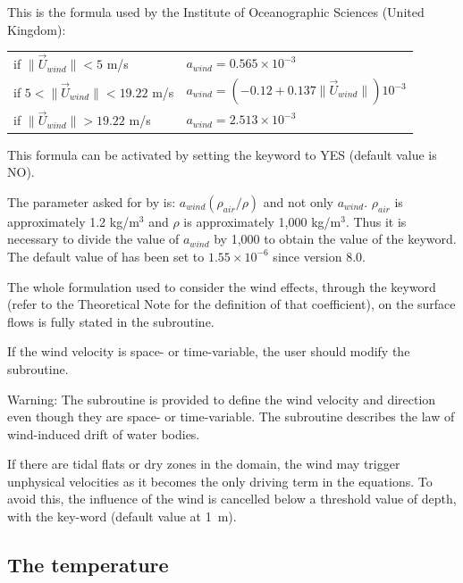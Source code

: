 This is the formula used by the Institute of Oceanographic Sciences (United
Kingdom):

\begin{tabular}{ll}
if $\| \vec{U}_{wind} \| < 5$ m/s & $a_{wind}  = 0.565 \times 10^{-3}$ \\
if $5 < \| \vec{U}_{wind} \| < 19.22$ m/s &
 $a_{wind} = (- 0.12 + 0.137 \| \vec{U}_{wind} \| ) 10^{-3}$ \\
if $\| \vec{U}_{wind} \| > 19.22$ m/s & $a_{wind} = 2.513 \times 10^{-3}$ \\
\end{tabular}

This formula can be activated by setting the keyword
 to YES
(default value is NO).

The parameter  asked for by 
is: $a_{wind} (\rho_{air} / \rho)$ and not only $a_{wind}$.
$\rho_{air}$ is approximately 1.2 kg/m$^3$ and $\rho$
is approximately 1,000 kg/m$^3$. Thus it is necessary to divide the value of
$a_{wind}$ by 1,000 to obtain the value of the  keyword.
The default value of  has been set to
$1.55 \times 10^{-6}$ since version 8.0.

The whole formulation used to consider the wind effects, through the keyword
 (refer to the Theoretical Note for the
definition of that coefficient), on the surface flows is fully stated in the
 subroutine.

If the wind velocity is space- or time-variable, the user should modify the
 subroutine.

\begin{WarningBlock}{Warning:}
The  subroutine is provided to define the wind velocity and
direction even though they are space- or time-variable.
The  subroutine describes the law of wind-induced drift
of water bodies.
\end{WarningBlock}

If there are tidal flats or dry zones in the domain, the wind may trigger
unphysical velocities as it becomes the only driving term in the equations. To
avoid this, the influence of the wind is cancelled below a threshold value of
depth, with the key-word  (default value at
1~m).


\subsection{The temperature}

